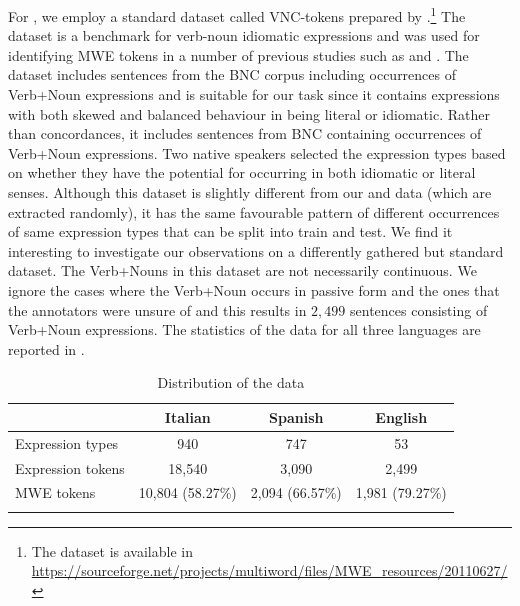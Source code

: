 \documentclass[output=paper,modfonts,nonflat]{langsci/langscibook}
\begin{document}
For , we employ a standard dataset called VNC-tokens prepared by \cite{cook2008vnc}.\footnote{The dataset is available in \url{https://sourceforge.net/projects/multiword/files/MWE_resources/20110627/}} The dataset is a benchmark for  verb-noun idiomatic expressions and was used for identifying MWE tokens in a number of previous studies such as \cite{fazly-cook-stevenson:2009:CL} and \cite{salton2016acl}.
The dataset includes sentences from the BNC corpus including occurrences of Verb+Noun expressions and is suitable for our task since it contains expressions with both skewed and balanced behaviour in being literal or idiomatic. 
Rather than concordances, it includes sentences from BNC containing occurrences of Verb+Noun expressions.
Two  native speakers selected the expression types based on whether they have the potential for occurring in both idiomatic or literal senses. Although this dataset is slightly different from our  and  data (which are extracted randomly), it has the same favourable pattern of different occurrences of same expression types that can be split into train and test. We find it interesting to investigate our observations on a differently gathered but standard dataset. 
The Verb+Nouns in this dataset are not necessarily continuous.
We ignore the cases where the Verb+Noun occurs in passive form and the ones that the annotators were unsure of and this results in $2,499$ sentences consisting of Verb+Noun expressions. The statistics of the data for all three languages are reported in .

\begin{table}[!ht]
\small
\caption{Distribution of the data}
\label{tab:data}
 \begin{tabular}{lccc} 
  \lsptoprule
    & Italian & Spanish & English  \\
  \midrule
   Expression types & 940 & 747 & 53 \\
   Expression tokens & 18,540 & 3,090 & 2,499  \\
   MWE tokens  & 10,804 (58.27\%) & 2,094 (66.57\%) & 1,981 (79.27\%)  \\
  \lspbottomrule
 \end{tabular}
\end{table}
\end{document}

